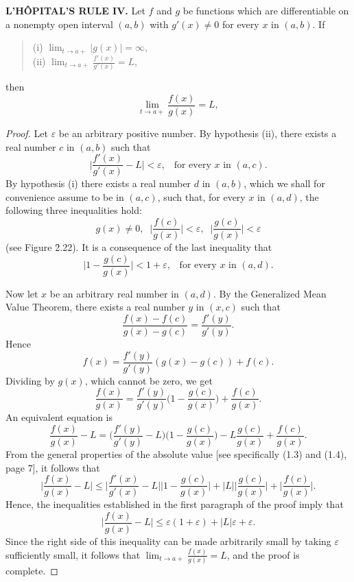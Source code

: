 \begin{theorem} %
\textbf{L'H\^{O}PITAL'S RULE IV.}  Let $f$ and $g$ be functions which are differentiable on a nonempty open interval $(a, b)$ with $g'(x) \neq 0$ for every $x$ in $(a, b)$. If


\begin{quote}
\begin{description}
\item[(i) $\lim_{t \rightarrow a+} |g(x)| = \infty$,]
\item[(ii) $\lim_{t \rightarrow a+} \frac{f'(x)}{g'(x)} = L$,]

\end{description}
\end{quote}

\noindent then
$$
\lim_{t \rightarrow a+} \frac{f(x)}{g(x)} = L,
$$
\end{theorem}

\begin{proof}
Let $\varepsilon$ be an arbitrary positive number. By hypothesis (ii), there exists a real number $c$ in $(a, b)$ such that
$$
\Big| \frac{f'(x)}{g'(x)} - L \Big| < \varepsilon, \;\;\; \mbox{for every $x$ in $(a, c)$}. 
$$
By hypothesis (i) there exists a real number $d$ in $(a, b)$, which we shall for convenience assume to be in $(a, c)$, such that, for every $x$ in $(a, d)$, the following three inequalities hold:
$$
g(x) \neq 0, \;\; \Big| \frac{f(c)}{g(x)} \Big| < \varepsilon, \;\; \Big|\frac{g(c)}{g(x)} \Big| < \varepsilon
$$
(see Figure \f{2.22}).
It is a consequence of the last inequality that
$$
\Big| 1 - \frac{g(c)}{g(x)} \Big| < 1 + \varepsilon, \;\;\; \mbox{for every $x$ in $(a, d)$}.
$$

Now let $x$ be an arbitrary real number in $(a, d)$. By the Generalized Mean Value Theorem, there exists a real number $y$ in $(x, c)$ such that
$$
\frac{f(x)-f(c)}{g(x)- g(c)} = \frac{f'(y)}{g'(y)}.
$$
Hence
$$
 f(x) = \frac{f'(y)}{g'(y)}(g(x) - g(c)) + f(c).
$$
\noindent Dividing by $g(x)$, which cannot be zero, we get 
$$
\frac{f(x)}{g(x)} = \frac{f'(y)}{g'(y)} \biggl(1 - \frac{g(c)}{g(x)}\biggr) + \frac{f(c)}{g(x) }.
$$
An equivalent equation is
$$
\frac{f(x)}{g(x)} - L = \biggl( \frac{f'(y)}{g'(y)} - L\biggr) \biggl(1 - \frac{g(c)}{g(x)}
\biggr) - L \frac{g(c)}{g(x)} + \frac{f(c)}{g(x)}.
$$
\noindent From the general properties of the absolute value [see specifically (1.3) and (1.4), page 7], it follows that
$$
\Big| \frac{f(x)}{g(x)} - L \Big| \leq \Big| \frac{f'(x)}{g'(x)} - L \Big|  \Big| 1 - \frac{g(c)}{g(x)} \Big| + | L | \Big| \frac{g(c)}{g(x)} \Big| + \Big| \frac{f(c)}{g(x)} \Big|.
$$
Hence, the inequalities established in the first paragraph of the proof imply that
$$
\Big| \frac{f(x)}{g(x)} - L \Big| \leq \varepsilon (1 + \varepsilon) + |L| \varepsilon + \varepsilon.
$$
Since the right side of this inequality can be made arbitrarily small by taking $\varepsilon$ sufficiently small, it follows that $\lim_{t \rightarrow a+} \frac{f(x)}{g(x)} = L$, and the proof is complete. 
\end{proof}

